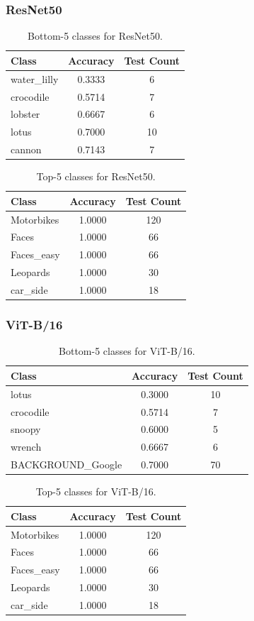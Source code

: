 \documentclass[11pt]{article}
\begin{document}
\subsubsection{ResNet50}
\begin{table}[H]
\centering
\caption{Bottom-5 classes for ResNet50.}
\begin{tabular}{lcc}
\toprule
Class & Accuracy & Test Count \\
\midrule
water\_lilly & 0.3333 & 6 \\
crocodile & 0.5714 & 7 \\
lobster & 0.6667 & 6 \\
lotus & 0.7000 & 10 \\
cannon & 0.7143 & 7 \\
\bottomrule
\end{tabular}
\end{table}

\begin{table}[H]
\centering
\caption{Top-5 classes for ResNet50.}
\begin{tabular}{lcc}
\toprule
Class & Accuracy & Test Count \\
\midrule
Motorbikes & 1.0000 & 120 \\
Faces & 1.0000 & 66 \\
Faces\_easy & 1.0000 & 66 \\
Leopards & 1.0000 & 30 \\
car\_side & 1.0000 & 18 \\
\bottomrule
\end{tabular}
\end{table}

\subsubsection{ViT-B/16}
\begin{table}[H]
\centering
\caption{Bottom-5 classes for ViT-B/16.}
\begin{tabular}{lcc}
\toprule
Class & Accuracy & Test Count \\
\midrule
lotus & 0.3000 & 10 \\
crocodile & 0.5714 & 7 \\
snoopy & 0.6000 & 5 \\
wrench & 0.6667 & 6 \\
BACKGROUND\_Google & 0.7000 & 70 \\
\bottomrule
\end{tabular}
\end{table}

\begin{table}[H]
\centering
\caption{Top-5 classes for ViT-B/16.}
\begin{tabular}{lcc}
\toprule
Class & Accuracy & Test Count \\
\midrule
Motorbikes & 1.0000 & 120 \\
Faces & 1.0000 & 66 \\
Faces\_easy & 1.0000 & 66 \\
Leopards & 1.0000 & 30 \\
car\_side & 1.0000 & 18 \\
\bottomrule
\end{tabular}
\end{table}
\end{document}
